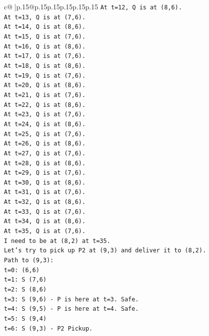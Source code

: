 \documentclass{article}
\begin{document}
{\begin{supertabular}{c@{$\;$}|p{.15\linewidth}@{}p{.15\linewidth}p{.15\linewidth}p{.15\linewidth}p{.15\linewidth}p{.15\linewidth}}
{{{\texttt{At t=12, Q is at (8,6).} \\
\texttt{At t=13, Q is at (7,6).} \\
\texttt{At t=14, Q is at (8,6).} \\
\texttt{At t=15, Q is at (7,6).} \\
\texttt{At t=16, Q is at (8,6).} \\
\texttt{At t=17, Q is at (7,6).} \\
\texttt{At t=18, Q is at (8,6).} \\
\texttt{At t=19, Q is at (7,6).} \\
\texttt{At t=20, Q is at (8,6).} \\
\texttt{At t=21, Q is at (7,6).} \\
\texttt{At t=22, Q is at (8,6).} \\
\texttt{At t=23, Q is at (7,6).} \\
\texttt{At t=24, Q is at (8,6).} \\
\texttt{At t=25, Q is at (7,6).} \\
\texttt{At t=26, Q is at (8,6).} \\
\texttt{At t=27, Q is at (7,6).} \\
\texttt{At t=28, Q is at (8,6).} \\
\texttt{At t=29, Q is at (7,6).} \\
\texttt{At t=30, Q is at (8,6).} \\
\texttt{At t=31, Q is at (7,6).} \\
\texttt{At t=32, Q is at (8,6).} \\
\texttt{At t=33, Q is at (7,6).} \\
\texttt{At t=34, Q is at (8,6).} \\
\texttt{At t=35, Q is at (7,6).} \\
\texttt{I need to be at (8,2) at t=35.} \\
\texttt{Let's try to pick up P2 at (9,3) and deliver it to (8,2).} \\
\texttt{Path to (9,3):} \\
\texttt{t=0: (6,6)} \\
\texttt{t=1: S (7,6)} \\
\texttt{t=2: S (8,6)} \\
\texttt{t=3: S (9,6) {-} P is here at t=3. Safe.} \\
\texttt{t=4: S (9,5) {-} P is here at t=4. Safe.} \\
\texttt{t=5: S (9,4)} \\
\texttt{t=6: S (9,3) {-} P2 Pickup.} \\
}}}
\end{supertabular}}
\end{document}
